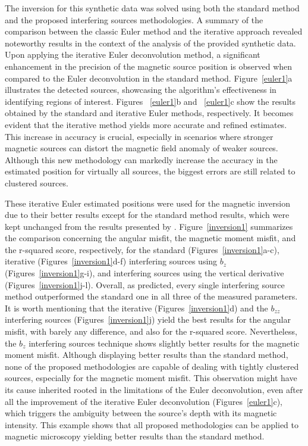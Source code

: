 The inversion for this synthetic data was solved using both the standard method \citep{Souza-Junior2023b} and the proposed interfering sources methodologies. A summary of the comparison between the classic Euler method and the iterative approach revealed noteworthy results in the context of the analysis of the provided synthetic data. Upon applying the iterative Euler deconvolution method, a significant enhancement in the precision of the magnetic source position is observed when compared to the Euler deconvolution in the standard method. Figure~\ref{euler1}a illustrates the detected sources, showcasing the algorithm's effectiveness in identifying regions of interest. Figures ~\ref{euler1}b and ~\ref{euler1}c show the results obtained by the standard and iterative Euler methods, respectively. It becomes evident that the iterative method yields more accurate and refined estimates. This increase in accuracy is crucial, especially in scenarios where stronger magnetic sources can distort the magnetic field anomaly of weaker sources. Although this new methodology can markedly increase the accuracy in the estimated position for virtually all sources, the biggest errors are still related to clustered sources.


These iterative Euler estimated positions were used for the magnetic inversion due to their better results except for the standard method results, which were kept unchanged from the results presented by \citet{Souza-Junior2023b}. Figure~\ref{inversion1} summarizes the comparison concerning the angular misfit, the magnetic moment misfit, and the r-squared score, respectively, for the standard (Figures~\ref{inversion1}a-c), iterative (Figures~\ref{inversion1}d-f) interfering sources using $b_z$ (Figures~\ref{inversion1}g-i), and interfering sources using the vertical derivative (Figures~\ref{inversion1}j-l). Overall, as predicted, every single interfering source method outperformed the standard one in all three of the measured parameters. It is worth mentioning that the iterative (Figures~\ref{inversion1}d) and the $b_{zz}$ interfering sources (Figures~\ref{inversion1}j) yield the best results for the angular misfit, with barely any difference, and also for the r-squared score. Nevertheless, the $b_{z}$ interfering sources technique shows slightly better results for the magnetic moment misfit. Although displaying better results than the standard method, none of the proposed methodologies are capable of dealing with tightly clustered sources, especially for the magnetic moment misfit. This observation might have its cause inherited rooted in the limitations of the Euler deconvolution, even after all the improvement of the iterative Euler deconvolution (Figures~\ref{euler1}c), which triggers the ambiguity between the source's depth with its magnetic intensity. This example shows that all proposed methodologies can be applied to magnetic microscopy yielding better results than the standard method.



